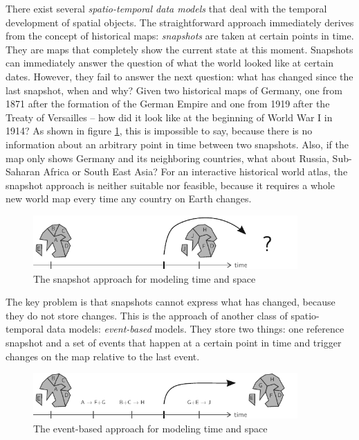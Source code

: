 There exist several \emph{spatio-temporal data models} that deal with the temporal development of spatial objects. The straightforward approach immediately derives from the concept of historical maps: \emph{snapshots} are taken at certain points in time. They are maps that completely show the current state at this moment. Snapshots can immediately answer the question of what the world looked like at certain dates. However, they fail to answer the next question: what has changed since the last snapshot, when and why? Given two historical maps of Germany, one from 1871 after the formation of the German Empire and one from 1919 after the Treaty of Versailles -- how did it look like at the beginning of World War I in 1914? As shown in figure \ref{fig:snapshot_approach}, this is impossible to say, because there is no information about an arbitrary point in time between two snapshots. Also, if the map only shows Germany and its neighboring countries, what about Russia, Sub-Saharan Africa or South East Asia? For an interactive historical world atlas, the snapshot approach is neither suitable nor feasible, because it requires a whole new world map every time any country on Earth changes.

\begin{figure}[ht]
  \vspace{1em}
  \centering
  \includegraphics[width=0.9\textwidth]{graphics/introduction/snapshot_approach}
  \caption{The snapshot approach for modeling time and space}
  \label{fig:snapshot_approach}
\end{figure}

\newpage
The key problem is that snapshots cannot express what has changed, because they do not store changes. This is the approach of another class of spatio-temporal data models: \emph{event-based} models. They store two things: one reference snapshot and a set of events that happen at a certain point in time and trigger changes on the map relative to the last event.

\begin{figure}[ht]
  \vspace{1em}
  \centering
  \includegraphics[width=0.9\textwidth]{graphics/introduction/event_based_approach}
  \caption{The event-based approach for modeling time and space}
  \label{fig:event_based_approach}
\end{figure}

